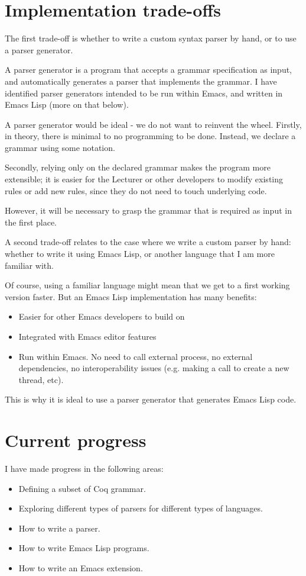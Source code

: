 \section{Implementation trade-offs}
The first trade-off is whether to write a custom syntax parser by hand, or to use a parser generator.

A parser generator is a program that accepts a grammar specification as input, and automatically generates a parser that implements the grammar. I have identified parser generators intended to be run within Emacs, and written in Emacs Lisp (more on that below).

A parser generator would be ideal - we do not want to reinvent the wheel. Firstly, in theory, there is minimal to no programming to be done. Instead, we declare a grammar using some notation. 

Secondly, relying only on the declared grammar makes the program more extensible; it is easier for the Lecturer or other developers to modify existing rules or add new rules, since they do not need to touch underlying code.

However, it will be necessary to grasp the grammar that is required as input in the first place. 

A second trade-off relates to the case where we write a custom parser by hand: whether to write it using Emacs Lisp, or another language that I am more familiar with.

Of course, using a familiar language might mean that we get to a first working version faster. But an Emacs Lisp implementation has many benefits: 
\begin{itemize}
    \item Easier for other Emacs developers to build on  
    \item Integrated with Emacs editor features
    \item Run within Emacs. No need to call external process, no external dependencies, no interoperability issues (e.g. making a call to create a new thread, etc).  
\end{itemize}


This is why it is ideal to use a parser generator that generates Emacs Lisp code.  

\section{Current progress}
I have made progress in the following areas: 

\begin{itemize}
    \item Defining a subset of Coq grammar.
    \item Exploring different types of parsers for different types of languages.
    \item How to write a parser.
    \item How to write Emacs Lisp programs.
    \item How to write an Emacs extension.
\end{itemize}


